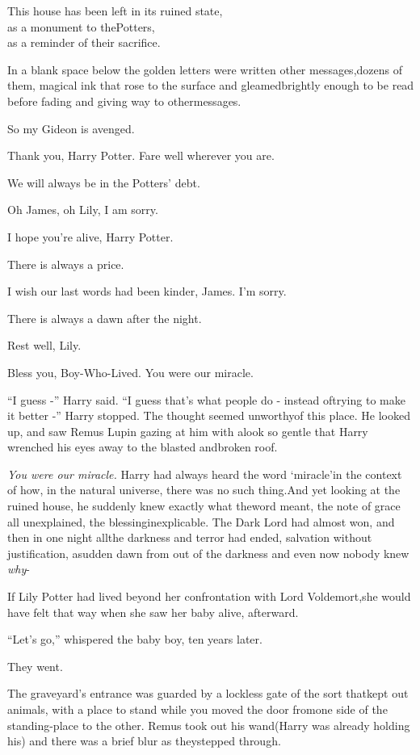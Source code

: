 This house has been left in its ruined state,\\ as a monument to thePotters,\\ as a reminder of their sacrifice.

In a blank space below the golden letters were written other messages,dozens of them, magical ink that rose to the surface and gleamedbrightly enough to be read before fading and giving way to othermessages.

So my Gideon is avenged.

Thank you, Harry Potter. Fare well wherever you are.

We will always be in the Potters' debt.

Oh James, oh Lily, I am sorry.

I hope you're alive, Harry Potter.

There is always a price.

I wish our last words had been kinder, James. I'm sorry.

There is always a dawn after the night.

Rest well, Lily.

Bless you, Boy-Who-Lived. You were our miracle.

``I guess -'' Harry said. ``I guess that's what people do - instead oftrying to make it better -'' Harry stopped. The thought seemed unworthyof this place. He looked up, and saw Remus Lupin gazing at him with alook so gentle that Harry wrenched his eyes away to the blasted andbroken roof.

\emph{You were our miracle.} Harry had always heard the word `miracle'in the context of how, in the natural universe, there was no such thing.And yet looking at the ruined house, he suddenly knew exactly what theword meant, the note of grace all unexplained, the blessinginexplicable. The Dark Lord had almost won, and then in one night allthe darkness and terror had ended, salvation without justification, asudden dawn from out of the darkness and even now nobody knew \emph{why}-

If Lily Potter had lived beyond her confrontation with Lord Voldemort,she would have felt that way when she saw her baby alive, afterward.

``Let's go,'' whispered the baby boy, ten years later.

They went.

The graveyard's entrance was guarded by a lockless gate of the sort thatkept out animals, with a place to stand while you moved the door fromone side of the standing-place to the other. Remus took out his wand(Harry was already holding his) and there was a brief blur as theystepped through.

